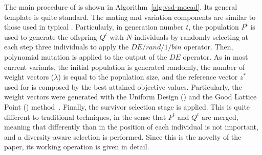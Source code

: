 The main procedure of \AVSDMOEAD{} is shown in Algorithm~\ref{alg:vsd-moead}.
%
Its general template is quite standard.
%
The mating and variation components are similar to those used in typical \MOEAS{}.
%
Particularly, in generation number $t$, the population $P^t$ is used to generate
the offspring $Q^t$ with $N$ individuals by randomly selecting at each step three individuals
to apply the $DE/rand/1/bin$ operator.
%
Then, polynomial mutation is applied to the output of the $DE$ operator.
%
As in most current \MOEAD{} variants, the initial population is generated randomly,
the number of weight vectors ($\lambda$) is equal to the population size,
and the reference vector $z^*$ used for \ASF{} is composed by the best attained 
objective values.
%
Particularly, the weight vectors were generated
with the Uniform Design (\UD{}) and the Good Lattice Point (\GLP{}) method~\cite{tan2013moea1, tan2013moea2}.
%
Finally, the survivor selection stage is applied.
%
This is quite different to traditional techniques, in the sense that $P^t$ and $Q^t$ are merged, meaning
that differently than in \MOEAD{} the position of each individual is not important, and a diversity-aware
selection is performed.
%
Since this is the novelty of the paper, its working operation is given in detail.

